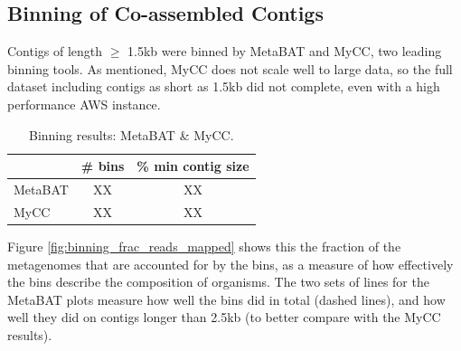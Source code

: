 \subsection{Binning of Co-assembled Contigs}

Contigs of length $\geq$ 1.5kb were binned by MetaBAT and MyCC, two leading binning tools.
As mentioned, MyCC does not scale well to large data, so the full dataset including contigs as short as 1.5kb did not complete, even with a high performance AWS instance.

\begin{table}[H]
\centering
\begin{singlespace}
\caption[Binning results: MetaBAT \& MyCC]
	{Binning results: MetaBAT \& MyCC.}
\label{table:sample_read_sizes}
\begin{tabular}{l | cc}
            & \# bins & \% min contig size \\  %
\midrule
	MetaBAT & XX   & XX \\
	MyCC    & XX   & XX \\
\end{tabular}
\end{singlespace}
\end{table}

Figure \ref{fig:binning_frac_reads_mapped} shows this the fraction of the metagenomes that are accounted for by the bins, as a measure of how effectively the bins describe the composition of organisms.
The two sets of lines for the MetaBAT plots measure how well the bins did in total (dashed lines), and how well they did on contigs longer than 2.5kb (to better compare with the MyCC results).


